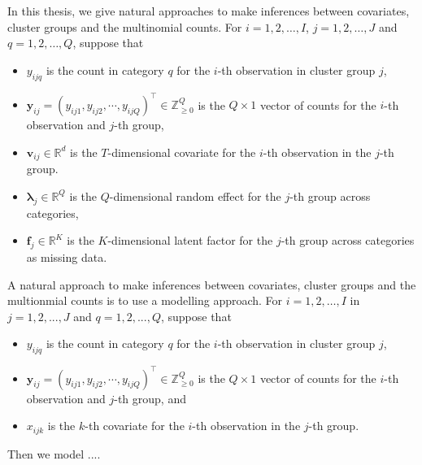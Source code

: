 
In this thesis, we give natural approaches to make inferences between covariates, cluster groups and the multinomial counts. For $i = 1, 2, \dots, I$, $j = 1, 2, \dots, J$ and $q = 1, 2, \dots, Q$, suppose that 

\begin{itemize}
\item  $y_{ijq}$ is the count in category $q$ for the $i$-th observation in cluster group $j$,
\item $\boldsymbol{y}_{ij} = (y_{ij1}, y_{ij2}, \cdots, y_{ijQ})^\top \in \mathbb{Z}^{Q}_{\geq 0}$ is the $Q\times 1$ vector of counts for the $i$-th observation and $j$-th group, 
\item $\bm{v}_{ij}\in \mathbb{R}^{d}$ is the $T$-dimensional covariate for the $i$-th observation in the $j$-th group.
\item $\bm{\lambda}_{j}\in \mathbb{R}^{Q}$ is the $Q$-dimensional random effect for the $j$-th group across categories,
\item $\mathbf{f}_{j}\in \mathbb{R}^{K}$ is the $K$-dimensional latent factor for the $j$-th group across categories as missing data.
\end{itemize}

\iffalse
{}

A natural approach to make inferences between covariates, cluster groups and the multionmial counts is to use a modelling approach. For $i = 1, 2, \dots, I$ in $j = 1, 2, ..., J$ and $q = 1, 2, ..., Q$, suppose that 

\begin{itemize}
\item  $y_{ijq}$ is the count in category $q$ for the $i$-th observation in cluster group $j$,
\item $\boldsymbol{y}_{ij} = (y_{ij1}, y_{ij2}, \cdots, y_{ijQ})^\top \in \mathbb{Z}^{Q}_{\geq 0}$ is the $Q\times 1$ vector of counts for the $i$-th observation and $j$-th group, and 
\item $x_{ijk}$ is the $k$-th covariate for the $i$-th observation in the $j$-th group.
\end{itemize}

\noindent Then we model ....



